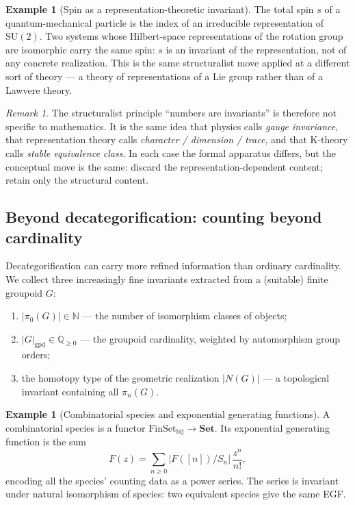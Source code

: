 \documentclass[12pt]{article}
\theoremstyle{definition}
\newtheorem{example}[theorem]{Example}
\theoremstyle{remark}
\newtheorem{remark}[theorem]{Remark}
\newcommand{\Set}{\mathbf{Set}}
\newcommand{\NN}{\mathbb{N}}
\newcommand{\QQ}{\mathbb{Q}}
\begin{document}
\begin{example}[Spin as a representation-theoretic invariant]
The total spin $s$ of a quantum-mechanical particle is the index of an irreducible representation of $\mathrm{SU}(2)$. Two systems whose Hilbert-space representations of the rotation group are isomorphic carry the same spin: $s$ is an invariant of the representation, not of any concrete realization. This is the same structuralist move applied at a different sort of theory --- a theory of representations of a Lie group rather than of a Lawvere theory.
\end{example}

\begin{remark}
The structuralist principle ``numbers are invariants'' is therefore not specific to mathematics. It is the same idea that physics calls \emph{gauge invariance}, that representation theory calls \emph{character / dimension / trace}, and that K-theory calls \emph{stable equivalence class}. In each case the formal apparatus differs, but the conceptual move is the same: discard the representation-dependent content; retain only the structural content.
\end{remark}

\subsection{Beyond decategorification: counting beyond cardinality}

Decategorification can carry more refined information than ordinary cardinality. We collect three increasingly fine invariants extracted from a (suitable) finite groupoid $G$:
\begin{enumerate}
  \item $|\pi_0(G)| \in \NN$ --- the number of isomorphism classes of objects;
  \item $|G|_{\mathrm{gpd}} \in \QQ_{\geq 0}$ --- the groupoid cardinality, weighted by automorphism group orders;
  \item the homotopy type of the geometric realization $|N(G)|$ --- a topological invariant containing all $\pi_n(G)$.
\end{enumerate}

\begin{example}[Combinatorial species and exponential generating functions]
A combinatorial species is a functor $\mathrm{FinSet}_{\mathrm{bij}} \to \Set$. Its exponential generating function is the sum
\[
  F(z) = \sum_{n \geq 0} |F([n])/S_n| \, \frac{z^n}{n!},
\]
encoding all the species' counting data as a power series. The series is invariant under natural isomorphism of species: two equivalent species give the same EGF.
\end{example}
\end{document}
